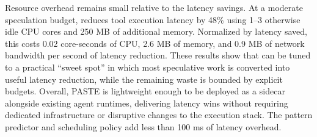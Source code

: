 Resource overhead remains small relative to the latency savings.
At a moderate speculation budget, \sys reduces tool execution latency by 48\% using 1--3 otherwise idle CPU cores and 250 MB of additional memory.
Normalized by latency saved, this costs 0.02 core-seconds of CPU, 2.6 MB of memory, and 0.9 MB of network bandwidth per second of latency reduction.
These results show that \sys can be tuned to a practical ``sweet spot'' in which most speculative work is converted into useful latency reduction, while the remaining waste is bounded by explicit budgets.
Overall, PASTE is lightweight enough to be deployed as a sidecar alongside existing agent runtimes, delivering latency wins without requiring dedicated infrastructure or disruptive changes to the execution stack.
%
The pattern predictor and scheduling policy add less than 100 ms of latency overhead.
